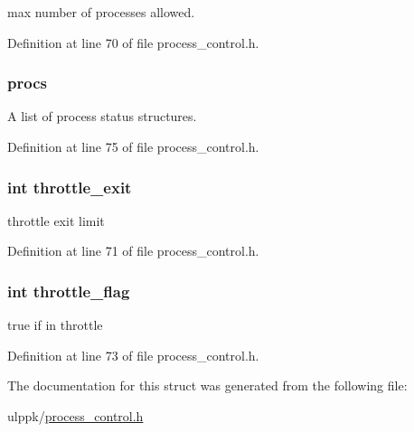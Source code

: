 max number of processes allowed. 



Definition at line 70 of file process\-\_\-control.\-h.

\hypertarget{struct_f_c_d_s_a46eee4f98d3615544a47bb946496b65d}{
\subsubsection[{procs}]{ procs}}\label{struct_f_c_d_s_a46eee4f98d3615544a47bb946496b65d}


A list of process status structures. 



Definition at line 75 of file process\-\_\-control.\-h.

\hypertarget{struct_f_c_d_s_a785895435655db8bd37084d207ac7c81}{
\subsubsection[{throttle\-\_\-exit}]{\setlength{\rightskip}{0pt plus 5cm}int throttle\-\_\-exit}}\label{struct_f_c_d_s_a785895435655db8bd37084d207ac7c81}


throttle exit limit 



Definition at line 71 of file process\-\_\-control.\-h.

\hypertarget{struct_f_c_d_s_adbd9378cafe136fe58e589f0ea79f0ca}{
\subsubsection[{throttle\-\_\-flag}]{\setlength{\rightskip}{0pt plus 5cm}int throttle\-\_\-flag}}\label{struct_f_c_d_s_adbd9378cafe136fe58e589f0ea79f0ca}


true if in throttle 



Definition at line 73 of file process\-\_\-control.\-h.



The documentation for this struct was generated from the following file\-:\begin{DoxyCompactItemize}
\item 
ulppk/\hyperlink{process__control_8h}{process\-\_\-control.\-h}\end{DoxyCompactItemize}
